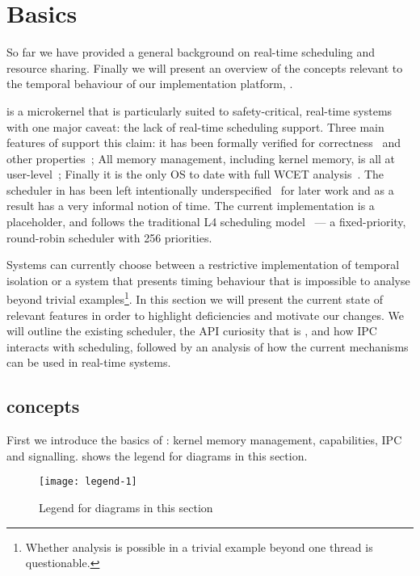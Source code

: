 

\chapter{\selfour Basics}


So far we have provided a general background on real-time scheduling and resource sharing.
Finally we will present an overview of the concepts relevant to the temporal behaviour of our implementation platform, \selfour.

\selfour is a microkernel that is particularly suited to safety-critical, real-time systems with one major caveat: the lack of real-time scheduling support. 
Three main features of \selfour support this claim: it has been formally verified for correctness~\citep{Klein_EHACDEEKNSTW_09} and other properties~\citep{Sewell_WGMAK_11}; All memory management, including kernel memory, is all at user-level~\citep{Elkaduwe_Derrin_06}; Finally it is the only \gls{OS} to date with full \gls{WCET} analysis~\citep{Blackham_SCRH_11}.
The scheduler in \selfour has been left intentionally underspecified~\citep{Petters_EH_12} for later work and as a result has a very informal notion of time.
The current implementation is a placeholder, and follows the traditional L4 scheduling model~\citep{Ruocco_06} --- a fixed-priority, round-robin scheduler with 256 priorities.

Systems can currently choose between a restrictive implementation of temporal isolation or a system that presents timing behaviour that is impossible to analyse beyond trivial examples\footnote{Whether analysis is possible in a trivial example beyond one thread is questionable.}.
In this section we will present the current state of relevant \selfour features in order to highlight deficiencies and motivate our changes.
We will outline the existing scheduler, the API curiosity that is \yield, and how \gls{IPC} interacts with scheduling, followed by an analysis of how the current mechanisms can be used in real-time systems.


\section{\selfour concepts}

First we introduce the basics of \selfour: kernel memory management, capabilities, \gls{IPC} and
signalling.  shows the legend for diagrams in this section. 

\begin{figure}
    \centering
    \texttt{[image: legend-1]}
    \caption{Legend for diagrams in this section}
    \label{f:legend-1}
\end{figure}


